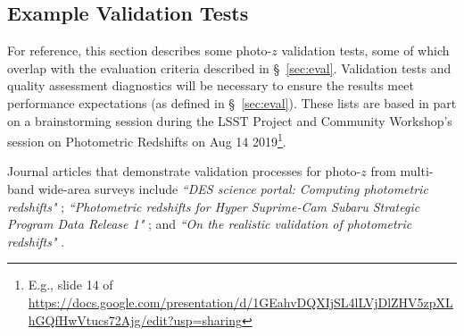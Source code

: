 \documentclass[DM,authoryear,toc]{lsstdoc}
\begin{document}
\subsection{Example Validation Tests}\label{ssec:imp_val}

For reference, this section describes some photo-$z$ validation tests, some of which overlap with the evaluation criteria described in \S~\ref{sec:eval}. 
Validation tests and quality assessment diagnostics will be necessary to ensure the results meet performance expectations (as defined in \S~\ref{sec:eval}).
These lists are based in part on a brainstorming session during the LSST Project and Community Workshop's session on Photometric Redshifts on Aug 14 2019\footnote{E.g., slide 14 of \url{https://docs.google.com/presentation/d/1GEahvDQXIjSL4lLVjDlZHV5zpXLhGQfHwVtucs72Ajg/edit?usp=sharing}}.

Journal articles that demonstrate validation processes for photo-$z$ from multi-band wide-area surveys include {\it ``DES science portal: Computing photometric redshifts"} \citep{2018A&C....25...58G}; {\it ``Photometric redshifts for Hyper Suprime-Cam Subaru Strategic Program Data Release 1"} \citep{2018PASJ...70S...9T}; and {\it ``On the realistic validation of photometric redshifts"} \citep{2017MNRAS.468.4323B}. 
\end{document}
